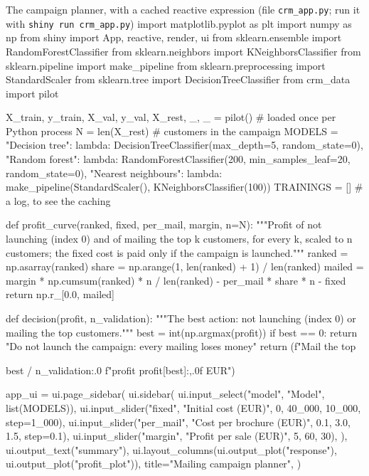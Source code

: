 \begin{pylisting}[label={lst:crmapp}]{The campaign planner, with a cached reactive expression (file \texttt{crm\_app.py}; run it with \texttt{shiny run crm\_app.py})}
import matplotlib.pyplot as plt
import numpy as np
from shiny import App, reactive, render, ui
from sklearn.ensemble import RandomForestClassifier
from sklearn.neighbors import KNeighborsClassifier
from sklearn.pipeline import make_pipeline
from sklearn.preprocessing import StandardScaler
from sklearn.tree import DecisionTreeClassifier
from crm_data import pilot

X_train, y_train, X_val, y_val, X_rest, _, _ = pilot()   # loaded once per Python process
N = len(X_rest)                                          # customers in the campaign
MODELS = {"Decision tree": lambda: DecisionTreeClassifier(max_depth=5, random_state=0),
          "Random forest": lambda: RandomForestClassifier(200, min_samples_leaf=20,
                                                          random_state=0),
          "Nearest neighbours": lambda: make_pipeline(StandardScaler(),
                                                     KNeighborsClassifier(100))}
TRAININGS = []                                           # a log, to see the caching

def profit_curve(ranked, fixed, per_mail, margin, n=N):
    """Profit of not launching (index 0) and of mailing the top k customers, for every k,
    scaled to n customers; the fixed cost is paid only if the campaign is launched."""
    ranked = np.asarray(ranked)
    share = np.arange(1, len(ranked) + 1) / len(ranked)
    mailed = margin * np.cumsum(ranked) * n / len(ranked) - per_mail * share * n - fixed
    return np.r_[0.0, mailed]

def decision(profit, n_validation):
    """The best action: not launching (index 0) or mailing the top customers."""
    best = int(np.argmax(profit))
    if best == 0:
        return "Do not launch the campaign: every mailing loses money"
    return (f"Mail the top {best / n_validation:.0%
            f"profit {profit[best]:,.0f} EUR")

app_ui = ui.page_sidebar(
    ui.sidebar(
        ui.input_select("model", "Model", list(MODELS)),
        ui.input_slider("fixed", "Initial cost (EUR)", 0, 40_000, 10_000, step=1_000),
        ui.input_slider("per_mail", "Cost per brochure (EUR)", 0.1, 3.0, 1.5, step=0.1),
        ui.input_slider("margin", "Profit per sale (EUR)", 5, 60, 30),
    ),
    ui.output_text("summary"),
    ui.layout_columns(ui.output_plot("response"), ui.output_plot("profit_plot")),
    title="Mailing campaign planner",
)

}
\end{pylisting}
